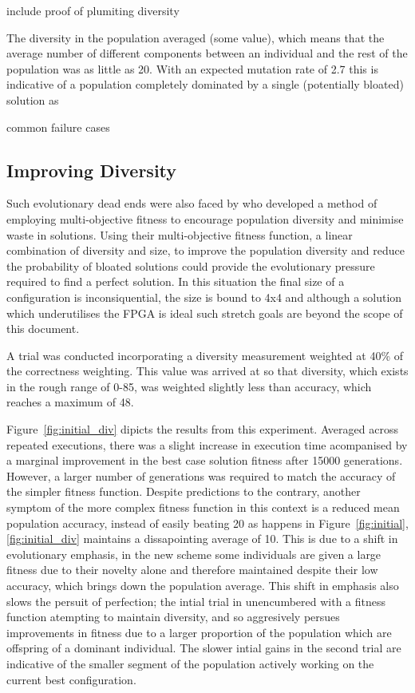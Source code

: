 \todo include proof of plumiting diversity

The diversity in the population averaged (some value), which means that the average number
of different components between an individual and the rest of the population was
as little as 20. With an expected mutation rate of 2.7 this is
indicative of a population completely dominated by a single (potentially bloated)
solution as

\todo common failure cases

\subsection{Improving Diversity}
Such evolutionary
dead ends were also faced by \cite{deJong:2001:RBP:2955239.2955241} who developed
a method of employing multi-objective fitness to encourage population diversity
and minimise waste in solutions. Using their multi-objective fitness function,
a linear combination of diversity and size, to improve the population diversity
and reduce the probability of bloated solutions could provide the evolutionary
pressure required to find a perfect solution. In this situation the final size
of a configuration is inconsiquential, the size is bound to 4x4 and although
a solution which underutilises the FPGA is ideal such stretch goals are beyond
the scope of this document.

A trial was conducted incorporating a diversity measurement weighted at 40\%
of the correctness weighting. This value was arrived at so that diversity,
which exists in the rough range of 0-85, was weighted slightly less than
accuracy, which reaches a maximum of 48.

Figure~\ref{fig:initial_div} dipicts the results from this experiment. Averaged across
repeated executions, there was a slight increase in execution time acompanised by
a marginal improvement in the best case solution fitness
after 15000 generations. However, a larger number of generations was required
to match the accuracy of the simpler fitness function. Despite predictions
to the contrary, another symptom of
the more complex fitness function in this context is a reduced mean population accuracy,
instead of easily beating 20 as happens in Figure~\ref{fig:initial},
\ref{fig:initial_div} maintains a dissapointing
average of 10. This is due to a shift in evolutionary emphasis, in the new
scheme some individuals are given a large fitness due to their novelty alone
and therefore maintained despite their low accuracy, which brings down the
population average. This shift in emphasis also slows the
persuit of perfection; the intial trial in unencumbered with a fitness function
atempting to maintain diversity, and so aggresively persues improvements in
fitness due to a larger proportion of the population which are offspring of a
dominant individual. The slower intial gains in the second trial are indicative
of the smaller segment of the population actively working on the current best
configuration.

